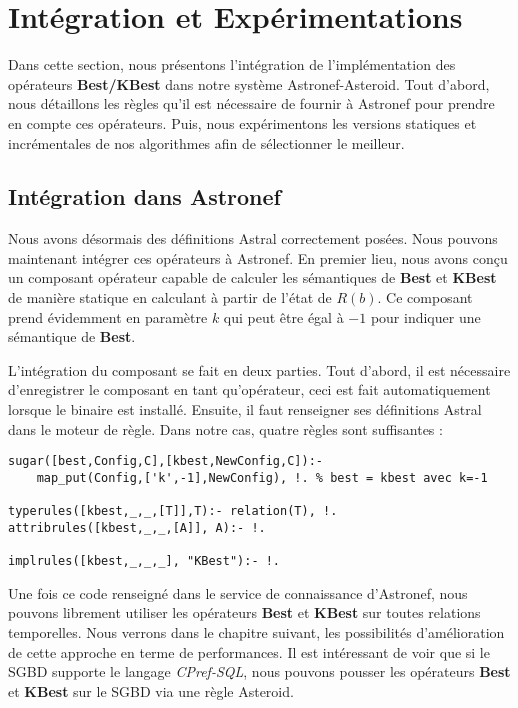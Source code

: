 \section{Intégration et Expérimentations}\label{sec:ext:prefs:integration}
Dans cette section, nous présentons l'intégration de l'implémentation des opérateurs \textbf{Best/KBest} dans notre système Astronef-Asteroid. Tout d'abord, nous détaillons les règles qu'il est nécessaire de fournir à Astronef pour prendre en compte ces opérateurs. Puis, nous expérimentons les versions statiques et incrémentales de nos algorithmes afin de sélectionner le meilleur.

\subsection{Intégration dans Astronef}
Nous avons désormais des définitions Astral correctement posées. Nous pouvons maintenant intégrer ces opérateurs à Astronef. En premier lieu, nous avons conçu un composant opérateur capable de calculer les sémantiques de \textbf{Best} et \textbf{KBest} de manière statique en calculant à partir de l'état de $R(b)$. Ce composant prend évidemment en paramètre $k$ qui peut être égal à $-1$ pour indiquer une sémantique de \textbf{Best}.

L'intégration du composant se fait en deux parties. Tout d'abord, il est nécessaire d'enregistrer le composant en tant qu'opérateur, ceci est fait automatiquement lorsque le binaire est installé. Ensuite, il faut renseigner ses définitions Astral dans le moteur de règle. Dans notre cas, quatre règles sont suffisantes :
\begin{lstlisting}
sugar([best,Config,C],[kbest,NewConfig,C]):-
    map_put(Config,['k',-1],NewConfig), !. % best = kbest avec k=-1

typerules([kbest,_,_,[T]],T):- relation(T), !.
attribrules([kbest,_,_,[A]], A):- !.

implrules([kbest,_,_,_], "KBest"):- !.
\end{lstlisting}

Une fois ce code renseigné dans le service de connaissance d'Astronef, nous pouvons librement utiliser les opérateurs \textbf{Best} et \textbf{KBest} sur toutes relations temporelles. Nous verrons dans le chapitre suivant, les possibilités d'amélioration de cette approche en terme de performances. Il est intéressant de voir que si le SGBD supporte le langage \textit{CPref-SQL}, nous pouvons pousser les opérateurs \textbf{Best} et \textbf{KBest} sur le SGBD via une règle Asteroid. 

